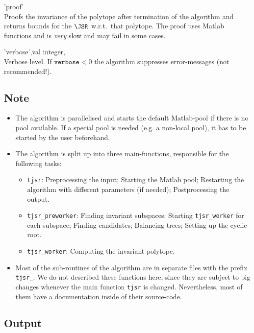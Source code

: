 \begin{param}
\item['proof'] \\Proofs the invariance of the polytope after termination of the algorithm and returns bounds for the $\JSR$ w.r.t.\ that polytope. The proof uses Matlab functions and is \emph{very} slow and may fail in some cases.




\item['verbose',val] integer, \\Verbose level. If $\texttt{verbose}<0$ the algorithm suppresses error-messages (not recommended!).
\end{param}


\subsection*{Note}
\begin{itemize}
\item The algorithm is parallelised and starts the default Matlab-pool if there is no pool available. If a special pool is needed (e.g. a non-local pool), it has to be started by the user beforehand.
\item The algorithm is split up into three main-functions, responsible for the following tasks:
\begin{itemize}
\item \texttt{tjsr}:
        Preprocessing the input;
        Starting the Matlab pool;
        Restarting the algorithm  with different parameters (if needed);
        Postprocessing the output.
\item \texttt{tjsr\_preworker}:
        Finding invariant subspaces;
        Starting \texttt{tjsr\_worker} for each subspace;
        Finding candidates;
        Balancing trees;
        Setting up the cyclic-root.   
\item \texttt{tjsr\_worker}:
        Computing the invariant polytope.
\end{itemize}
\item Most of the sub-routines of the algorithm are in separate files with the prefix \texttt{tjsr\_}. We do not described these functions here, since they are subject to big changes whenever the main function \texttt{tjsr} is changed. Nevertheless, most of them have a documentation inside of their source-code.
\end{itemize}

\subsection*{Output}
